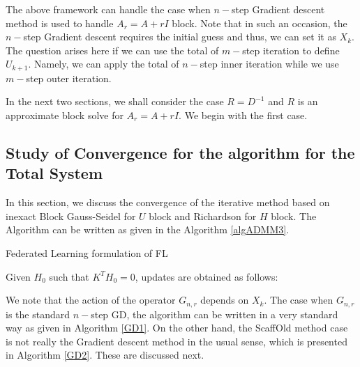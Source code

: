 \begin{itemize}
\begin{remark}
The above framework can handle the case when $n-$step Gradient descent method is used to handle $A_r = A + rI$ block. Note that in such an occasion, the $n-$step Gradient descent requires the initial guess and thus, we can set it as $X_k$. 
The question arises here if we can use the total of $m-$step iteration to define $U_{k+1}$. Namely, we can apply the total of $n-$step inner iteration while we use $m-$step outer iteration. 
\end{remark} 
In the next two sections, we shall consider the case $R = D^{-1}$ and $R$ is an approximate block solve for $A_r = A + rI$. We begin with the first case. 


\subsection{Study of Convergence for the algorithm for the Total System} 
In this section, we discuss the convergence of the iterative method based on inexact Block Gauss-Seidel for $U$ block and Richardson for $H$ block. The Algorithm can be written as given in the Algorithm \ref{algADMM3}.
\begin{algorithm}
\caption{Federated Learning formulation of FL}\label{algADMM3} 
Given $H_0$ such that $K^TH_0 = 0$, updates are obtained as follows:  
\begin{algorithmic}
\EndFor
\end{algorithmic}
\end{algorithm}
We note that the action of the operator $G_{n,r}$ depends on $X_k$. The case when $G_{n,r}$ is the standard $n-$step GD, the algorithm can be written in a very standard way as given in Algorithm \ref{GD1}. On the other hand, the ScaffOld method case is not really the Gradient descent method in the usual sense, which is presented in Algorithm \ref{GD2}. These are discussed next.

\end{itemize}
